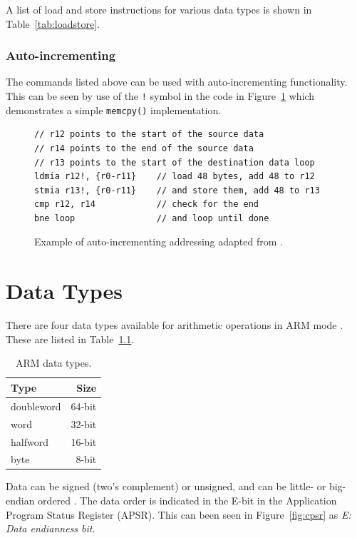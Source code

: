 \documentclass[oneside,a4paper]{report}
\begin{document}
A list of load and store instructions for various data types is shown in Table~\ref{tab:loadstore}.

\subsection{Auto-incrementing}
The commands listed above can be used with auto-incrementing functionality. This can be seen by use of the \texttt{!} symbol in the code in Figure~\ref{fig:autoincrement} which demonstrates a simple \texttt{memcpy()} implementation.

\begin{figure}[htb]
	\centering
	\begin{lstlisting}[language={[ARM]Assembler}]
// r12 points to the start of the source data
// r14 points to the end of the source data
// r13 points to the start of the destination data loop
ldmia r12!, {r0-r11}    // load 48 bytes, add 48 to r12
stmia r13!, {r0-r11}    // and store them, add 48 to r13
cmp r12, r14            // check for the end
bne loop                // and loop until done
	\end{lstlisting}
	\caption{Example of auto-incrementing addressing adapted from \cite[p. 61]{ARMInst}.}
	\label{fig:autoincrement}
\end{figure}

\chapter{Data Types}

There are four data types available for arithmetic operations in ARM mode \cite[p. 2-14]{A8Ref}. These are listed in Table~\ref{tab:datatypes}.

\begin{table}[htb]
	\centering
	\begin{tabular}{lr}
		\toprule
		Type			&		Size		\\
		\midrule
		doubleword		&		64-bit		\\
		word			& 		32-bit		\\
		halfword 		& 		16-bit		\\
		byte 			& 		8-bit		\\
		\bottomrule
	\end{tabular}
	\caption{ARM data types.}
	\label{tab:datatypes}
\end{table}

Data can be signed (two's complement) or unsigned, and can be little- or big-endian ordered \cite[p. 4-2]{A8Ref}. The data order is indicated in the E-bit in the Application Program Status Register (APSR). This can been seen in Figure~\ref{fig:cpsr} as \emph{E: Data endianness bit}.
\end{document}
